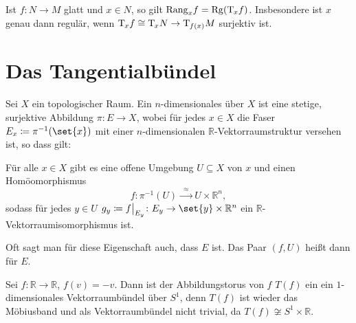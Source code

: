 \begin{bemerkung}[{name=[Zusammenhang mit der Definition des Ranges]}]
	Ist $f \colon N \to M$ glatt und $x \in N$, so gilt $\mathrm{Rang}_x f = \Rg \enbrace*{\Tang_x f}$. 
	Insbesondere ist $x$ genau dann regulär, wenn $\mathrm{T}\mkern-0.85mu_x f \cong \mathrm{T}\mkern-0.85mu_x N \to \mathrm{T}\mkern-0.85mu_{f(x)} M$ surjektiv ist.
\end{bemerkung}

\newpage
\section{Das Tangentialbündel} %
\label{sec:das_tangentialbundel}

\begin{definition}[{name=[Tangentialbündel]}]
	Sei $X$ ein topologischer Raum. 
	Ein $n$-dimensionales  über $X$ ist eine stetige, surjektive Abbildung $\pi \colon E \to X$, wobei für jedes 
	$x \in X$ die Faser $E_x \coloneqq \pi^{-1} (\set{x})$ mit einer $n$-dimensionalen $\mathbb{R}$-Vektorraumstruktur versehen ist, so dass gilt:
	\begin{center}
		Für alle $x \in X$ gibt es eine offene Umgebung $U \subseteq X$ von $x$ und einen Homöomorphismus 
		\[
			f \colon \pi^{-1}(U) \xrightarrow{\enspace\approx \enspace} U \times \mathbb{R}^n, 
		\]
		sodass für jedes $y \in U$ $g_y \coloneqq f \big|_{E_y} \colon E_y  \to \set{y} \times \mathbb{R}^n $ ein $\mathbb{R}$-Vektorraumisomorphismus ist.
	\end{center}
	Oft sagt man für diese Eigenschaft auch, dass $E$  ist. 
	Das Paar $(f,U)$ heißt dann  für $E$.
\end{definition}

\begin{beispiel}[{name=[Möbiusband als Vektorraumbündel]}]
	Sei $f \colon \mathbb{R} \to \mathbb{R}$, $f(v)=-v$. 
	Dann ist der Abbildungstorus von $f$  $T(f)$ ein ein $1$-dimensionales Vektorraumbündel über $S^1$, denn $T(f)$ ist wieder das Möbiusband und als Vektorraumbündel nicht trivial, da $T(f) \not\cong S^1 \times \mathbb{R}$.
\end{beispiel}


